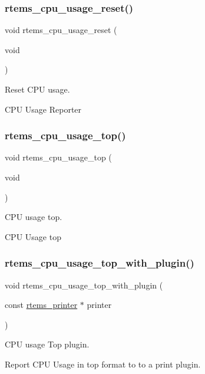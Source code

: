 \subsubsection{\texorpdfstring{rtems\_cpu\_usage\_reset()}{rtems\_cpu\_usage\_reset()}}
{\footnotesize\ttfamily void rtems\+\_\+cpu\+\_\+usage\+\_\+reset (\begin{DoxyParamCaption}\item[{void}]{ }\end{DoxyParamCaption})}



Reset C\+PU usage. 

C\+PU Usage Reporter \mbox{\label{group__libmisc__cpuuse_ga19ebbbc28253558959a17de6992d0ef2}} 
\subsubsection{\texorpdfstring{rtems\_cpu\_usage\_top()}{rtems\_cpu\_usage\_top()}}
{\footnotesize\ttfamily void rtems\+\_\+cpu\+\_\+usage\+\_\+top (\begin{DoxyParamCaption}\item[{void}]{ }\end{DoxyParamCaption})}



C\+PU usage top. 

C\+PU Usage top \mbox{\label{group__libmisc__cpuuse_gacd408d05bbbb31991311a6b90ef0b0a8}} 
\subsubsection{\texorpdfstring{rtems\_cpu\_usage\_top\_with\_plugin()}{rtems\_cpu\_usage\_top\_with\_plugin()}}
{\footnotesize\ttfamily void rtems\+\_\+cpu\+\_\+usage\+\_\+top\+\_\+with\+\_\+plugin (\begin{DoxyParamCaption}\item[{const \mbox{\hyperlink{structrtems__printer}{rtems\+\_\+printer}} $\ast$}]{printer }\end{DoxyParamCaption})}



C\+PU usage Top plugin. 

Report C\+PU Usage in top format to to a print plugin. 